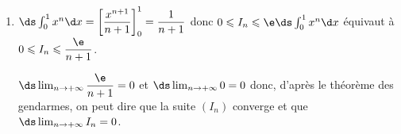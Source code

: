 \begin{enumerate}
\begin{list}{\textbullet}{}
Sur $\left [0\;;\;1\strut\right ]$, on a $x^n\geqslant 0$ donc $x^n \e^{x} \leqslant \e x^n$.

D'après la positivité de l'intégration, $\ds\int_{0}^{1} x^n \e^{x} \d x \leqslant \ds\int_{0}^{1} x^n \e \d x$, ce qui veut dire: $I_n \leqslant \e \ds\int_{0}^{1} x^n \d x$.
\end{list} 

On a donc démontré que: $0\leqslant I_n \leqslant  \e \ds\int_{0}^{1} x^n \d x$.

		\item %
$\ds\int_{0}^{1} x^n \d x = \left [ \dfrac{x^{n+1}}{n+1} \right ]_{0}^{1}=\dfrac{1}{n+1}$
donc $0\leqslant I_n \leqslant  \e \ds\int_{0}^{1} x^n \d x$ équivaut à $0\leqslant I_n \leqslant\dfrac{\e}{n+1}$.

$\ds\lim_{n\to +\infty} \dfrac{\e}{n+1}=0$ et $\ds\lim_{n\to +\infty} 0=0$ donc, d'après le théorème des gendarmes, on peut dire que la suite $(I_n)$ converge et que $\ds\lim_{n\to +\infty} I_n=0$.
		
	\end{enumerate}

